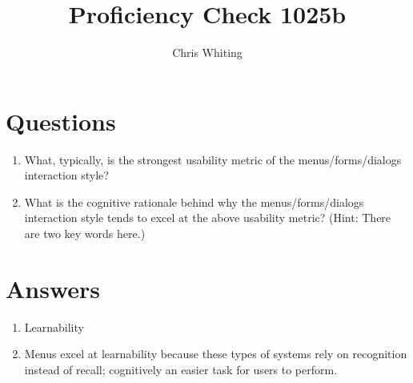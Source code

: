 \documentclass[11pt]{article}
\title{Proficiency Check 1025b}
\author{Chris Whiting}
\begin{document}
\maketitle

 
\section*{Questions}

\begin{enumerate}
\item What, typically, is the strongest usability metric of the menus/forms/dialogs interaction style?
\item What is the cognitive rationale behind why the menus/forms/dialogs interaction style tends to excel at the above usability metric? (Hint: There are two key words here.)
\end{enumerate}

\section*{Answers}

\begin{enumerate}
\item
 Learnability

\item
Menus excel at learnability because these types of systems rely on recognition instead of recall; cognitively an easier task for users to perform.

\end{enumerate}

%
%

\end{document}
